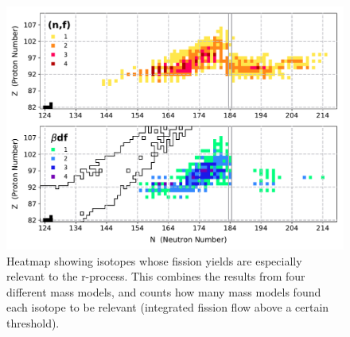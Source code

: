 \begin{figure}
	\centering
	\includegraphics[width=0.7\linewidth]{TeX_files/rProc_important-fissions}
	\caption[Isotopes whose fission yields are especially relevant to the r-process]{Heatmap showing isotopes whose fission yields are especially relevant to the r-process. This combines the results from four different mass models, and counts how many mass models found each isotope to be relevant (integrated fission flow above a certain threshold). \cite{Vassh2018}}
	\label{fig:rprocimportant-fissions}
\end{figure}
